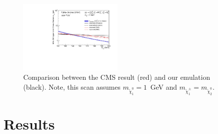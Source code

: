 
\begin{figure}[htb]
\includegraphics[width=0.45\textwidth]{figs/pheno/xsecUL_TChiwh_1_Total.pdf}
\caption{\label{fig:TChiwh1dLimit} Comparison between the CMS
 result (red) and our emulation (black). Note, this scan assumes
 $m_{\tilde\chi_1^0}=1$~GeV and $m_{\tilde{\chi}_1^{\pm}}=m_{\tilde{\chi}_2^0}$.}
\end{figure}


\section{Results}
\label{sec:results}

